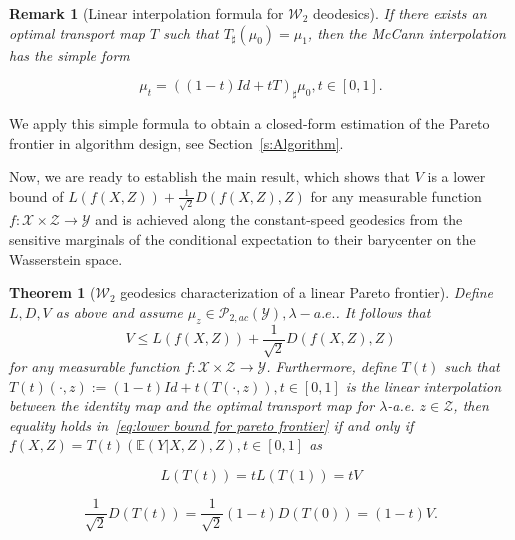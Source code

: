 \documentclass[twoside,11pt]{article}
\newtheorem{thm}{Theorem}[section]{\bfseries}{\itshape}
\newtheorem{rema}{Remark}[section]{\bfseries}{\itshape}
\begin{document}
\begin{rema}[Linear interpolation formula for $\mathcal{W}_2$ deodesics]\label{r:Linear Interpolation Formula for Geodesic Path}
If there exists an optimal transport map $T$ such that $T_{\sharp}(\mu_0) = \mu_1$, then the McCann interpolation has the simple form

\begin{equation} \label{eq:mccann interpolation}
\mu_t = ((1-t)Id + tT)_{\sharp}\mu_0, t \in [0,1].
\end{equation}

\end{rema}
We apply this simple formula to obtain a closed-form estimation of the Pareto frontier in algorithm design, see Section~\ref{s:Algorithm}.


Now, we are ready to establish the main result, which shows that $V$ is a lower bound of $L(f(X,Z)) + \frac{1}{\sqrt{2}} D(f(X,Z),Z)$ for any measurable function $f: \mathcal{X} \times \mathcal{Z} \rightarrow \mathcal{Y}$ and is achieved along the constant-speed geodesics from the sensitive marginals of the conditional expectation to their barycenter on the Wasserstein space. 

\begin{thm} [$\mathcal{W}_2$ geodesics characterization of a linear Pareto frontier] \label{th:Geodesics Characterization of the Pareto Frontier}
Define $L, D, V$ as above and assume $\mu_z \in \mathcal{P}_{2, ac}(\mathcal{Y}), \lambda-a.e.$. It follows that
\begin{equation} \label{eq:lower bound for pareto frontier}
V \leq L(f(X,Z)) + \frac{1}{\sqrt{2}}D(f(X,Z),Z)
\end{equation}
for any measurable function $f: \mathcal{X} \times \mathcal{Z} \rightarrow \mathcal{Y}$. Furthermore, define $T(t)$ such that $T(t)(\cdot,z) := (1-t)Id + t(T(\cdot,z)), t \in [0,1]$ is the linear interpolation between the identity map and the optimal transport map for $\lambda$-a.e. $z \in \mathcal{Z}$, then equality holds in~\eqref{eq:lower bound for pareto frontier} if and only if $f(X,Z) = T(t)(\mathbb{E}(Y|X,Z),Z), t \in [0,1]$ as

\begin{equation}
L(T(t)) = tL(T(1)) = tV
\end{equation}

\begin{equation}
\frac{1}{\sqrt{2}}D(T(t)) = \frac{1}{\sqrt{2}}(1-t)D(T(0)) = (1-t)V.
\end{equation}
\end{thm}
\end{document}
